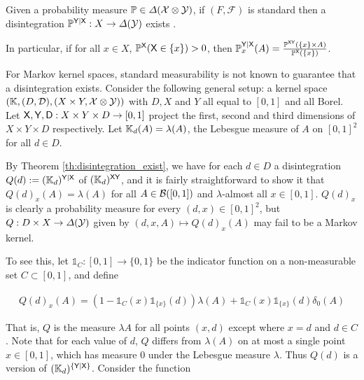 \begin{theorem}\label{th:disintegration_exist}
Given a probability measure $\mathbb{P}\in \Delta(\mathcal{X}\otimes \mathcal{Y})$, if $(F,\mathcal{F})$ is standard then a disintegration $\mathbb{P}^{\mathsf{Y}|\mathsf{X}}:X\to \Delta(\mathcal{Y})$ exists \citep{cinlar_probability_2011}.
\end{theorem}

In particular, if for all $x\in X$, $\mathbb{P}^{\mathsf{X}}(\mathsf{X}\in\{x\})>0$, then $\mathbb{P}^{\mathsf{Y}|\mathsf{X}}_x(A) = \frac{\mathbb{P}^{\mathsf{X}\mathsf{Y}}(\{x\}\times A)}{\mathbb{P}^{\mathsf{X}}(\{x\})}$.

For Markov kernel spaces, standard measurability is not known to guarantee that a disintegration exists. Consider the following general setup: a kernel space $(\mathbb{K},(D,\mathcal{D}),(X\times Y,\mathcal{X}\otimes\mathcal{Y}))$ with $D, X$ and $Y$ all equal to $[0,1]$ and all Borel. Let $\mathsf{X},\mathsf{Y},\mathsf{D}:X\times Y\times D\to [0,1]$ project the first, second and third dimensions of $X\times Y\times D$ respectively. Let $\mathbb{K}_d(A) = \lambda(A)$, the Lebesgue measure of $A$ on $[0,1]^2$ for all $d\in D$. 
 
By Theorem \ref{th:disintegration_exist}, we have for each $d\in D$ a disintegration $Q(d):=(\mathbb{K}_d)^{\mathsf{Y}|\mathsf{X}}$ of $(\mathbb{K}_d)^{\mathsf{X}\mathsf{Y}}$, and it is fairly straightforward to show it that $Q(d)_x(A)=\lambda(A)$ for all $A\in \mathcal{B}([0,1])$ and $\lambda$-almost all $x\in [0,1]$. $Q(d)_x$ is clearly a probability measure for every $(d,x)\in [0,1]^2$, but $Q:D\times X\to \Delta(\mathcal{Y})$ given by $(d,x,A)\mapsto Q(d)_x(A)$ may fail to be a Markov kernel. 

To see this, let $\mathds{1}_C:[0,1]\to \{0,1\}$ be the indicator function on a non-measurable set $C\subset[0,1]$, and define

\begin{align}
	Q(d)_{x}(A) = \left(1-\mathds{1}_C(x)\mathds{1}_{\{x\}}(d)\right)\lambda(A) + \mathds{1}_C(x)\mathds{1}_{\{x\}}(d)\delta_{0}(A)\label{eq:non_measurable_disint}
\end{align}

That is, $Q$ is the measure $\lambda{A}$ for all points $(x,d)$ except where $x=d$ and $d\in C$. Note that for each value of $d$, $Q$ differs from $\lambda(A)$ on at most a single point $x\in[0,1]$, which has measure $0$ under the Lebesgue measure $\lambda$. Thus $Q(d)$ is a version of $(\mathbb{K}_d)^{\{\mathsf{Y}|\mathsf{X}\}}$. Consider the function

